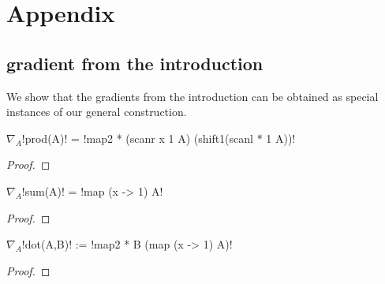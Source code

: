 \section{Appendix}

 \subsection{gradient from the introduction}

 We show that the gradients from the introduction 
 can be obtained as special instances of our general construction. 

 \begin{lemma}
     $\nabla_A$!prod(A)! = !map2 * (scanr x 1 A) (shift1(scanl * 1 A))!
 \end{lemma}

 \begin{proof}

 \end{proof}

 \begin{lemma}
     $\nabla_A$!sum(A)! = !map (x -> 1) A!
 \end{lemma}

 \begin{proof}

 \end{proof}

 \begin{lemma}
     $\nabla_A$!dot(A,B)! := !map2 * B (map (x -> 1) A)! 
 \end{lemma}

 \begin{proof}

 \end{proof}